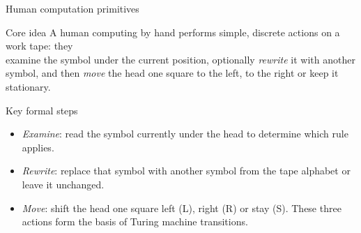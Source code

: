 \begin{frame}[t]{Human computation primitives}
  \begin{tblock}{Core idea}
    A human computing by hand performs simple, discrete actions on a
    work tape: they \\examine the symbol under the current position,
    optionally \textit{rewrite} it with another symbol, and then \textit{move}
    the head one square to the left, to the right or keep it stationary.
  \end{tblock}
  \begin{tblock}{Key formal steps}
    \begin{itemize}
      \item \emph{Examine}: read the symbol currently under the head to
        determine which rule applies.
      \item \emph{Rewrite}: replace that symbol with another symbol from
        the tape alphabet or leave it unchanged.
      \item \emph{Move}: shift the head one square left (L), right (R) or
        stay (S).  These three actions form the basis of Turing machine
        transitions.
    \end{itemize}
  \end{tblock}
  \label{fr:7.1-04}
\end{frame}

